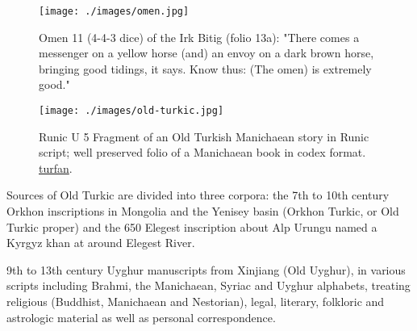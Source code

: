\begin{figure}[htb]
\centering

\texttt{[image: ./images/omen.jpg]}
\caption{Omen 11 (4-4-3 dice) of the Irk Bitig (folio 13a): "There comes a messenger on a yellow horse (and) an envoy on a dark brown horse, bringing good tidings, it says. Know thus: (The omen) is extremely good."}
\label{omen}
\end{figure}

\begin{figure}[htb]
\centering

\texttt{[image: ./images/old-turkic.jpg]}
\caption{Runic U 5
Fragment of an Old Turkish Manichaean story in Runic script; well preserved folio of a Manichaean book in codex format. \protect\href{http://turfan.bbaw.de/projekt-en/sprachen-und-schriften}{turfan}.}
\end{figure}





Sources of Old Turkic are divided into three corpora:
the 7th to 10th century Orkhon inscriptions in Mongolia and the Yenisey basin (Orkhon Turkic, or Old Turkic proper) and the 650 Elegest inscription about Alp Urungu named a Kyrgyz khan at around Elegest River.

9th to 13th century Uyghur manuscripts from Xinjiang (Old Uyghur), in various scripts including Brahmi, the Manichaean, Syriac and Uyghur alphabets, treating religious (Buddhist, Manichaean and Nestorian), legal, literary, folkloric and astrologic material as well as personal correspondence.


